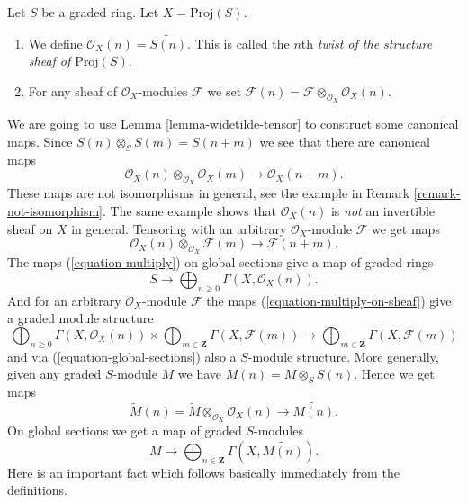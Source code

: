 \begin{definition}
\label{definition-twist}
Let $S$ be a graded ring. Let $X = \text{Proj}(S)$.
\begin{enumerate}
\item We define $\mathcal{O}_X(n) = \widetilde{S(n)}$.
This is called the $n$th
{\it twist of the structure sheaf of $\text{Proj}(S)$}.
\item For any sheaf of $\mathcal{O}_X$-modules $\mathcal{F}$ we set
$\mathcal{F}(n) = \mathcal{F} \otimes_{\mathcal{O}_X} \mathcal{O}_X(n)$.
\end{enumerate}
\end{definition}

\noindent
We are going to use Lemma \ref{lemma-widetilde-tensor}
to construct some canonical maps.
Since $S(n) \otimes_S S(m) = S(n + m)$ we see that there
are canonical maps
\begin{equation}
\label{equation-multiply}
\mathcal{O}_X(n) \otimes_{\mathcal{O}_X} \mathcal{O}_X(m)
\longrightarrow
\mathcal{O}_X(n + m).
\end{equation}
These maps are not isomorphisms in general, see the example in
Remark \ref{remark-not-isomorphism}. The same example shows
that $\mathcal{O}_X(n)$ is {\it not} an invertible sheaf on $X$ in
general. Tensoring with an arbitrary $\mathcal{O}_X$-module $\mathcal{F}$
we get maps
\begin{equation}
\label{equation-multiply-on-sheaf}
\mathcal{O}_X(n) \otimes_{\mathcal{O}_X} \mathcal{F}(m)
\longrightarrow
\mathcal{F}(n + m).
\end{equation}
The maps (\ref{equation-multiply}) on global sections give a map of graded
rings
\begin{equation}
\label{equation-global-sections}
S \longrightarrow \bigoplus\nolimits_{n \geq 0} \Gamma(X, \mathcal{O}_X(n)).
\end{equation}
And for an arbitrary $\mathcal{O}_X$-module $\mathcal{F}$ the maps
(\ref{equation-multiply-on-sheaf}) give a graded module structure
\begin{equation}
\label{equation-global-sections-module}
\bigoplus\nolimits_{n \geq 0} \Gamma(X, \mathcal{O}_X(n))
\times
\bigoplus\nolimits_{m \in \mathbf{Z}} \Gamma(X, \mathcal{F}(m))
\longrightarrow
\bigoplus\nolimits_{m \in \mathbf{Z}} \Gamma(X, \mathcal{F}(m))
\end{equation}
and via (\ref{equation-global-sections}) also a $S$-module structure.
More generally, given any graded $S$-module
$M$ we have $M(n) = M \otimes_S S(n)$. Hence we get maps
\begin{equation}
\label{equation-multiply-more-generally}
\widetilde M(n)
=
\widetilde M
\otimes_{\mathcal{O}_X}
\mathcal{O}_X(n)
\longrightarrow
\widetilde{M(n)}.
\end{equation}
On global sections we get a map of graded $S$-modules
\begin{equation}
\label{equation-global-sections-more-generally}
M \longrightarrow
\bigoplus\nolimits_{n \in \mathbf{Z}} \Gamma(X, \widetilde{M(n)}).
\end{equation}
Here is an important fact which follows basically immediately from the
definitions.

